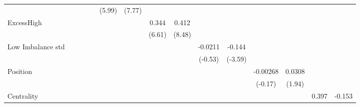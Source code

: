 {\begin{tabular}{l*{14}{c}}
                &                  &                  &                  &                  &   (5.99)         &   (7.77)         &                  &                  &                  &                  &                  &                  &                  &                  \\
[1em]
ExcessHigh      &                  &                  &                  &                  &                  &                  &    0.344\sym{***}&    0.412\sym{***}&                  &                  &                  &                  &                  &                  \\
                &                  &                  &                  &                  &                  &                  &   (6.61)         &   (8.48)         &                  &                  &                  &                  &                  &                  \\
[1em]
Low Imbalance std&                  &                  &                  &                  &                  &                  &                  &                  &  -0.0211         &   -0.144\sym{***}&                  &                  &                  &                  \\
                &                  &                  &                  &                  &                  &                  &                  &                  &  (-0.53)         &  (-3.59)         &                  &                  &                  &                  \\
[1em]
Position        &                  &                  &                  &                  &                  &                  &                  &                  &                  &                  & -0.00268         &   0.0308         &                  &                  \\
                &                  &                  &                  &                  &                  &                  &                  &                  &                  &                  &  (-0.17)         &   (1.94)         &                  &                  \\
[1em]
Centrality      &                  &                  &                  &                  &                  &                  &                  &                  &                  &                  &                  &                  &    0.397\sym{*}  &   -0.153         \\

\end{tabular}}
